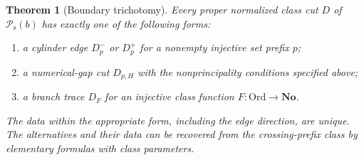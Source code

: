 \documentclass[11pt]{article}
\newtheorem{theorem}{Theorem}[section]
\theoremstyle{definition}
\theoremstyle{remark}
\newcommand{\No}{\mathbf{No}}
\newcommand{\Ord}{\mathrm{Ord}}
\newcommand{\Psupp}{\mathcal P_{\mathrm{s}}}
\begin{document}
\begin{theorem}[Boundary trichotomy]\label{swo:tc:thm:trichotomy}
Every proper normalized class cut $D$ of $\Psupp(b)$ has exactly one of
the following forms:
\begin{enumerate}[label=\textup{(\roman*)}]
\item a cylinder edge $D_p^-$ or $D_p^+$ for a nonempty injective set
prefix $p$;
\item a numerical-gap cut $D_{p,H}$ with the nonprincipality conditions
specified above;
\item a branch trace $D_F$ for an injective class function
$F:\Ord\to\No$.
\end{enumerate}
The data within the appropriate form, including the edge direction, are
unique. The alternatives and their data can be recovered from the
crossing-prefix class by elementary formulas with class parameters.
\end{theorem}
\end{document}
